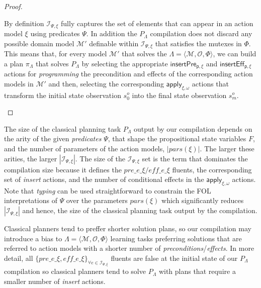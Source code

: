 \documentclass{article}
\newcommand{\tup}[1]{{\langle #1 \rangle}}
\begin{document}
\begin{proof}[Proof]
\begin{small}
By definition ${\mathcal I}_{\Psi,\xi}$ fully captures the set of elements that can appear in an action model $\xi$ using predicates $\Psi$. In addition the $P_{\Lambda}$ compilation does not discard any possible domain model $\mathcal{M}'$ definable within ${\mathcal I}_{\Psi,\xi}$ that satisfies the mutexes in $\Phi$. This means that, for every model $\mathcal{M}'$ that solves the $\Lambda=\tup{\mathcal{M},{\mathcal O},\Phi}$, we can build a plan $\pi_{\Lambda}$ that solves $P_{\Lambda}$ by selecting the appropriate $\mathsf{insertPre_{p,\xi}}$ and $\mathsf{insertEff_{p,\xi}}$ actions for {\em programming} the precondition and effects of the corresponding action models in $\mathcal{M}'$ and then, selecting the corresponding $\mathsf{apply_{\xi,\omega}}$ actions that transform the initial state observation $s_0^o$ into the final state observation $s_m^o$.
\end{small}
\end{proof}

The size of the classical planning task $P_{\Lambda}$ output by our compilation depends on the arity of the given {\em predicates} $\Psi$, that shape the propositional state variables $F$, and the number of parameters of the action models, $|pars(\xi)|$. The larger these arities, the larger $|{\mathcal I}_{\Psi,\xi}|$. The size of the ${\mathcal I}_{\Psi,\xi}$ set is the term that dominates the compilation size because it defines the $pre\_e\_\xi/eff\_e\_\xi$ fluents, the corresponding set of {\em insert} actions, and the number of conditional effects in the $\mathsf{apply_{\xi,\omega}}$ actions. Note that {\em typing} can be used straightforward to constrain the FOL interpretations of $\Psi$ over the parameters $pars(\xi)$ which significantly reduces $|{\mathcal I}_{\Psi,\xi}|$ and hence, the size of the classical planning task output by the compilation.

Classical planners tend to preffer shorter solution plans, so our compilation may introduce a bias to $\Lambda=\tup{\mathcal{M},{\mathcal O},\Phi}$ learning tasks preferring solutions that are referred to action models with a shorter number of {\em preconditions}/{\em effects}. In more detail, all $\{pre\_e\_\xi, eff\_e\_\xi\}_{\forall e\in{\mathcal I}_{\Psi,\xi}}$ fluents are false at the initial state of our $P_\Lambda$ compilation so classical planners tend to solve $P_\Lambda$ with plans that require a smaller number of {\em insert} actions.
\end{document}
